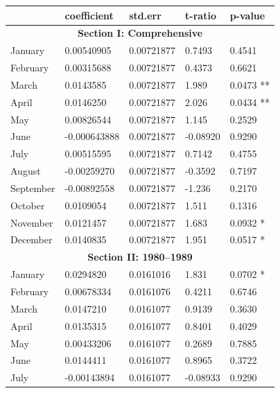 \documentclass[11pt, english]{article}
\begin{document}
	\begin{center}
                \scriptsize
        \begin{longtable}{p{2cm}p{2cm}p{2cm}p{2cm}p{2cm}}
                & \textbf{coefficient} & \textbf{std.err} & \textbf{t-ratio} & \textbf{p-value}\\
                \hline
                \multicolumn{5}{c}{\textbf{Section I: Comprehensive}}\\
                \hline
                January & 0.00540905 & 0.00721877 & 0.7493 & 0.4541\\
                February & 0.00315688 & 0.00721877 & 0.4373 & 0.6621\\
                March & 0.0143585 & 0.00721877 & 1.989 & 0.0473 **\\
                April & 0.0146250 & 0.00721877 & 2.026 & 0.0434 **\\
                May & 0.00826544 & 0.00721877 & 1.145 & 0.2529\\
                June & -0.000643888 & 0.00721877 & -0.08920 & 0.9290\\
                July & 0.00515595 & 0.00721877 & 0.7142 & 0.4755\\
                August & -0.00259270 & 0.00721877 & -0.3592 & 0.7197\\
                September & -0.00892558 & 0.00721877 & -1.236 & 0.2170\\
                October & 0.0109054 & 0.00721877 & 1.511 & 0.1316\\
                November & 0.0121457 & 0.00721877 & 1.683 & 0.0932 *\\
                December & 0.0140835 & 0.00721877 & 1.951 & 0.0517 *\\
                \hline
                \multicolumn{5}{c}{\textbf{Section II: 1980--1989}}\\
                \hline
                January & 0.0294820 & 0.0161016 & 1.831 & 0.0702 *\\     
                February & 0.00678334 & 0.0161076 & 0.4211 & 0.6746\\
                March & 0.0147210 & 0.0161077 & 0.9139 & 0.3630\\
                April & 0.0135315 & 0.0161077 & 0.8401 & 0.4029\\
                May & 0.00433206 & 0.0161077 & 0.2689 & 0.7885\\
                June & 0.0144411 & 0.0161077 & 0.8965 & 0.3722\\
                July & -0.00143894 & 0.0161077 & -0.08933 & 0.9290\\

\end{longtable}
\end{center}
\end{document}
